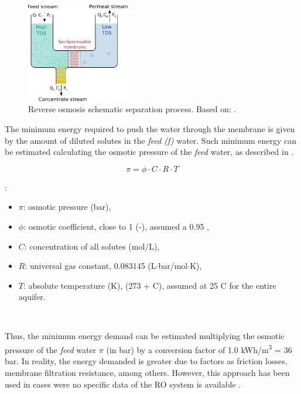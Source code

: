 \documentclass[12pt]{iopart}
\begin{document}
\begin{figure}[!h]
	\centering
	\includegraphics[width=0.4\textwidth]{Reverse_Osmosis}
	\caption[Reverse Osmosis schematic separation process]{Reverse osmosis schematic separation process. Based on: \cite{crittenden_mwhs_2012}.}
	\label{fig:ro}
\end{figure} 

The minimum energy required to push the water through the membrane is given by the amount of diluted solutes in the \textit{feed (f)} water. Such minimum energy can be estimated calculating the osmotic pressure of the \textit{feed} water, as described in  \cite{crittenden_mwhs_2012}.

\begin{equation}\label{eq:6}
\pi = \phi\cdot C\cdot R\cdot T
\end{equation}

:
\begin{itemize}[label={-}]
	\item $\pi$: osmotic pressure (bar),
	\item $\phi$: osmotic coefficient, close to 1 (-), assumed a 0.95 \cite{crittenden_mwhs_2012},
	\item $C$: concentration of all solutes (mol/L),
	\item $R$: universal gas constant, 0.083145 (L$\cdot$bar/mol$\cdot$K),
	\item $T$: absolute temperature (K), (273 + \degree C), assumed at 25 \degree C for the entire aquifer.
\end{itemize}~

Thus, the minimum energy demand can be estimated multiplying the osmotic pressure of the \textit{feed} water $\pi$ (in bar) by a conversion factor of 1.0 kWh/m\textsuperscript{3} = 36 bar. In reality, the energy demanded is greater due to factors as friction losses, membrane filtration resistance, among others. However, this approach has been used in cases were no specific data of the RO system is available \cite{KARABELAS201815}.
\end{document}

